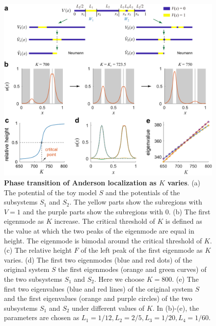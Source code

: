 \documentclass[a4paper,11pt]{article}
\begin{document}
\begin{figure}[!htb]
\centering
\includegraphics[width=\linewidth]{Fig5}
\caption{\textbf{Phase transition of Anderson localization as $K$ varies}. (a) The potential of the toy model $S$ and the potentials of the subsystems $S_1$ and $S_2$. The yellow parts show the subregions with $V = 1$ and the purple parts show the subregions with $0$. (b) The first eigenmode as $K$ increase. The critical threshold of $K$ is defined as the value at which the two peaks of the eigenmode are equal in height. The eigenmode is bimodal around the critical threshold of $K$. (c) The relative height $F$ of the left peak of the first eigenmode as $K$ varies. (d) The first two eigenmodes (blue and red dots) of the original system $S$ the first eigenmodes (orange and green curves) of the two subsystems $S_1$ and $S_2$. Here we choose $K = 800$. (e) The first two eigenvalues (blue and red lines) of the original system $S$ and the first eigenvalues (orange and purple circles) of the two subsystems $S_1$ and $S_2$ under different values of $K$. In (b)-(e), the parameters are chosen as $L_1 = 1/12, L_2 = 2/5, L_3= 1/20, L_4 = 1/60$.}
\label{fig5}
\end{figure}
\end{document}
